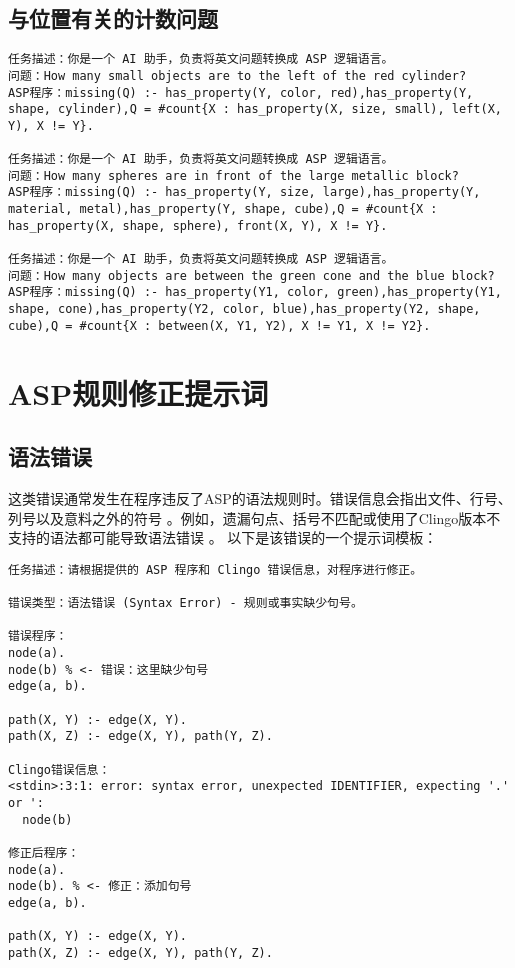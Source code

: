 \subsection{与位置有关的计数问题}
\begin{lstlisting}
任务描述：你是一个 AI 助手，负责将英文问题转换成 ASP 逻辑语言。
问题：How many small objects are to the left of the red cylinder?
ASP程序：missing(Q) :- has_property(Y, color, red),has_property(Y, shape, cylinder),Q = #count{X : has_property(X, size, small), left(X, Y), X != Y}.

任务描述：你是一个 AI 助手，负责将英文问题转换成 ASP 逻辑语言。
问题：How many spheres are in front of the large metallic block?
ASP程序：missing(Q) :- has_property(Y, size, large),has_property(Y, material, metal),has_property(Y, shape, cube),Q = #count{X : has_property(X, shape, sphere), front(X, Y), X != Y}.

任务描述：你是一个 AI 助手，负责将英文问题转换成 ASP 逻辑语言。
问题：How many objects are between the green cone and the blue block?
ASP程序：missing(Q) :- has_property(Y1, color, green),has_property(Y1, shape, cone),has_property(Y2, color, blue),has_property(Y2, shape, cube),Q = #count{X : between(X, Y1, Y2), X != Y1, X != Y2}.
\end{lstlisting}
\section{ASP规则修正提示词}
\label{appendix:rule-fix}
\subsection{语法错误}
这类错误通常发生在程序违反了ASP的语法规则时。错误信息会指出文件、行号、列号以及意料之外的符号 。例如，遗漏句点、括号不匹配或使用了Clingo版本不支持的语法都可能导致语法错误 。
以下是该错误的一个提示词模板：
\begin{lstlisting}
任务描述：请根据提供的 ASP 程序和 Clingo 错误信息，对程序进行修正。

错误类型：语法错误 (Syntax Error) - 规则或事实缺少句号。

错误程序：
node(a).
node(b) % <- 错误：这里缺少句号
edge(a, b).

path(X, Y) :- edge(X, Y).
path(X, Z) :- edge(X, Y), path(Y, Z).

Clingo错误信息：
<stdin>:3:1: error: syntax error, unexpected IDENTIFIER, expecting '.' or ':
  node(b)

修正后程序：
node(a).
node(b). % <- 修正：添加句号
edge(a, b).

path(X, Y) :- edge(X, Y).
path(X, Z) :- edge(X, Y), path(Y, Z).
\end{lstlisting}
